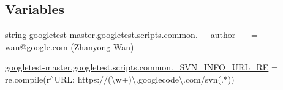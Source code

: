 \subsection*{Variables}
\begin{DoxyCompactItemize}
\item 
string \mbox{\hyperlink{namespacegoogletest-master_1_1googletest_1_1scripts_1_1common_a31d400546148f5b25d7893623b997f6b}{googletest-\/master.\+googletest.\+scripts.\+common.\+\_\+\+\_\+author\+\_\+\+\_\+}} = \textquotesingle{}wan@google.\+com (Zhanyong Wan)\textquotesingle{}
\item 
\mbox{\hyperlink{namespacegoogletest-master_1_1googletest_1_1scripts_1_1common_a2124f308e864e3a802b6dc35b592b2ed}{googletest-\/master.\+googletest.\+scripts.\+common.\+\_\+\+S\+V\+N\+\_\+\+I\+N\+F\+O\+\_\+\+U\+R\+L\+\_\+\+RE}} = re.\+compile(r\textquotesingle{}$^\wedge$U\+R\+L\+: https\+://(\textbackslash{}w+)\textbackslash{}.googlecode\textbackslash{}.\+com/svn(.$\ast$)\textquotesingle{})
\end{DoxyCompactItemize}
